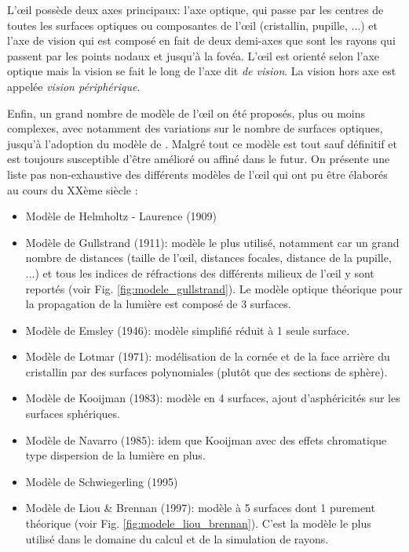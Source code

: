 	\par L'œil possède deux axes principaux: l'axe optique, qui passe par les centres de toutes les surfaces optiques ou composantes de l'œil (cristallin, pupille, ...) et l'axe de vision qui est composé en fait de deux demi-axes que sont les rayons qui passent par les points nodaux et jusqu'à la fovéa. L'œil est orienté selon l'axe optique mais la vision se fait le long de l'axe dit \textit{de vision}. La vision hors axe est appelée \textit{vision périphérique}.
	
	\par Enfin, un grand nombre de modèle de l'œil on été proposés, plus ou moins complexes, avec notamment des variations sur le nombre de surfaces optiques, jusqu'à l'adoption du modèle de \citep{liou_anatomically_1997}. Malgré tout ce modèle est tout sauf définitif et est toujours susceptible d'être amélioré ou affiné dans le futur. On présente une liste pas non-exhaustive des différents modèles de l'œil qui ont pu être élaborés au cours du XXème siècle \citep{liou_anatomically_1997,gross_human_2008}:
	\begin{itemize}
		\item Modèle de Helmholtz - Laurence (1909)
		\item Modèle de Gullstrand (1911): modèle le plus utilisé, notamment car un grand nombre de distances (taille de l'œil, distances focales, distance de la pupille, ...) et tous les indices de réfractions des différents milieux de l'œil y sont reportés (voir Fig. \ref{fig:modele_gullstrand}). Le modèle optique théorique pour la propagation de la lumière est composé de 3 surfaces.
		\item Modèle de Emsley (1946): modèle simplifié réduit à 1 seule surface.
		\item Modèle de Lotmar (1971): modélisation de la cornée et de la face arrière du cristallin par des surfaces polynomiales (plutôt que des sections de sphère).
		\item Modèle de Kooijman (1983): modèle en 4 surfaces, ajout d'asphéricités sur les surfaces sphériques.
		\item Modèle de Navarro (1985): idem que Kooijman avec des effets chromatique type dispersion de la lumière en plus.
		\item Modèle de Schwiegerling (1995)
		\item Modèle de Liou \& Brennan (1997): modèle à 5 surfaces dont 1 purement théorique (voir Fig. \ref{fig:modele_liou_brennan}). C'est la modèle le plus utilisé dans le domaine du calcul et de la simulation de rayons. 
	\end{itemize}
	
